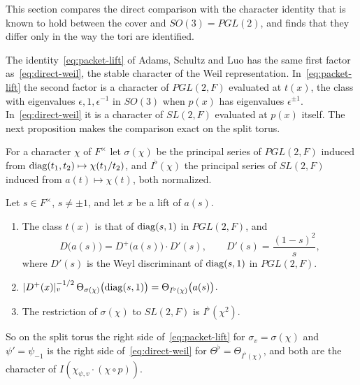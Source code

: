 This section compares the direct comparison with the character identity
that is known to hold between the cover and $SO(3)=PGL(2)$, and finds
that they differ only in the way the tori are identified.

The identity~\eqref{eq:packet-lift} of Adams, Schultz and Luo has the
same first factor as~\eqref{eq:direct-weil}, the stable character of the
Weil representation. In~\eqref{eq:packet-lift} the second factor is a
character of $PGL(2,F)$ evaluated at $t(x)$, the class with eigenvalues
$\epsilon,1,\epsilon^{-1}$ in $SO(3)$ when $p(x)$ has eigenvalues
$\epsilon^{\pm1}$. In~\eqref{eq:direct-weil} it is a character of
$SL(2,F)$ evaluated at $p(x)$ itself. The next proposition makes the
comparison exact on the split torus.

For a character $\chi$ of $F^\times$ let $\sigma(\chi)$ be the principal
series of $PGL(2,F)$ induced from $\operatorname{diag}(t_1,t_2)\mapsto\chi(t_1/t_2)$,
and $I^\flat(\chi)$ the principal series of $SL(2,F)$ induced from
$a(t)\mapsto\chi(t)$, both normalized.

\begin{proposition}\label{prop:wrong-orbit}
Let $s\in F^\times$, $s\ne\pm1$, and let $x$ be a lift of $a(s)$.
\begin{enumerate}[label=(\alph*)]
\item The class $t(x)$ is that of $\operatorname{diag}(s,1)$ in $PGL(2,F)$, and
  \[
  D\bigl(a(s)\bigr)=D^+\bigl(a(s)\bigr)\cdot D'(s),\qquad
  D'(s)=\frac{(1-s)^2}{s},
  \]
  where $D'(s)$ is the Weyl discriminant of $\operatorname{diag}(s,1)$ in $PGL(2,F)$.
\item $|D^+(x)|_v^{-1/2}\,\Theta_{\sigma(\chi)}\bigl(\operatorname{diag}(s,1)\bigr)=
  \Theta_{I^\flat(\chi)}\bigl(a(s)\bigr)$.
\item The restriction of $\sigma(\chi)$ to $SL(2,F)$ is $I^\flat(\chi^2)$.
\end{enumerate}
So on the split torus the right side of~\eqref{eq:packet-lift} for
$\sigma_v=\sigma(\chi)$ and $\psi'=\psi_{-1}$ is the right side
of~\eqref{eq:direct-weil} for $\Theta^\flat=\Theta_{I^\flat(\chi)}$, and both
are the character of $I(\chi_{\psi,v}\cdot(\chi\circ p))$.
\end{proposition}

